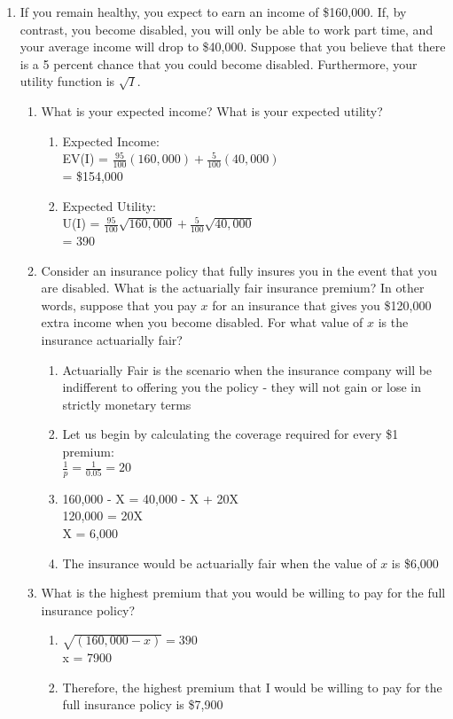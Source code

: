 \documentclass[11pt]{article}
\begin{document}
\begin{enumerate}
\item If you remain healthy, you expect to earn an income of \$160,000. If, by contrast, you become disabled, you will only be able to work part time, and your average income will drop to \$40,000. Suppose that you believe that there is a 5 percent chance that you could become disabled. Furthermore, your utility function is $\sqrt{I}$.
    \begin{enumerate}
    \item What is your expected income? What is your expected utility?
        \begin{enumerate}
            \item Expected Income:\\
            EV(I) = $\frac{95}{100}(160,000) + \frac{5}{100}(40,000) $\\
            = \$154,000
            \item Expected Utility:\\
            U(I) = $\frac{95}{100}\sqrt{160,000} + \frac{5}{100}\sqrt{40,000}$\\
            = 390
        \end{enumerate}

    \item Consider an insurance policy that fully insures you in the event that you are disabled. What is the actuarially fair insurance premium? In other words, suppose that you pay $x$ for an insurance that gives you \$120,000 extra income when you become disabled. For what value of $x$ is the insurance actuarially fair?
        \begin{enumerate}
            \item Actuarially Fair is the scenario when the insurance company will be indifferent to offering you the policy - they will not gain or lose in strictly monetary terms
            \item Let us begin by calculating the coverage required for every \$1 premium:\\
            $\frac{1}{p}=\frac{1}{0.05}=20$
            \item 160,000 - X = 40,000 - X + 20X\\
            120,000 = 20X\\
            X = 6,000
            \item The insurance would be actuarially fair when the value of $x$ is \$6,000
        \end{enumerate}

    \item What is the highest premium that you would be willing to pay for the full insurance policy?
        \begin{enumerate}
            \item $\sqrt{(160,000-x)} = 390$\\
            x = 7900
            \item Therefore, the highest premium that I would be willing to pay for the full insurance policy is \$7,900
        \end{enumerate}
    \end{enumerate}
        
\end{enumerate}
\end{document}
